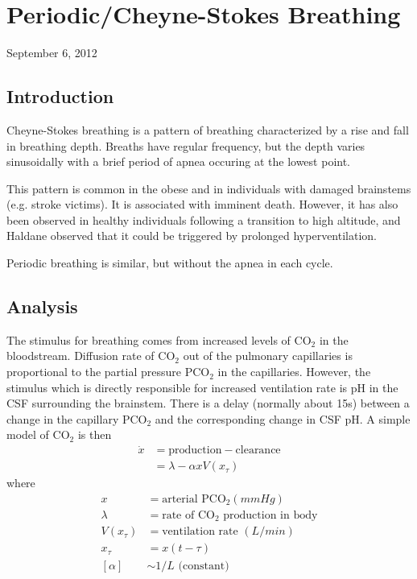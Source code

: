 \section{Periodic/Cheyne-Stokes Breathing}
September 6, 2012

\subsection{Introduction}

Cheyne-Stokes breathing is a pattern of breathing characterized by a rise and fall in breathing depth. Breaths have regular frequency, but the depth varies sinusoidally with a brief period of apnea occuring at the lowest point.

This pattern is common in the obese and in individuals with damaged brainstems (e.g. stroke victims). It is associated with imminent death. However, it has also been observed in healthy individuals following a transition to high altitude, and Haldane observed that it could be triggered by prolonged hyperventilation.

Periodic breathing is similar, but without the apnea in each cycle.

\subsection{Analysis}

The stimulus for breathing comes from increased levels of $\mathrm{CO}_2$ in the bloodstream. Diffusion rate of $\mathrm{CO}_2$ out of the pulmonary capillaries is proportional to the partial pressure $\mathrm{PCO}_2$ in the capillaries. However, the stimulus which is directly responsible for increased ventilation rate is pH in the CSF surrounding the brainstem. There is a delay (normally about 15s) between a change in the capillary $\mathrm{PCO}_2$ and the corresponding change in CSF pH. A simple model of $\mathrm{CO}_2$ is then 
\begin{align}
  \dot{x} &=\text{production}-\text{clearance}\nonumber \\ &= \lambda - \alpha xV(x_\tau)
  \label{eq:xdot}
\end{align}
where
\begin{align*}
  x &= \text{arterial PCO}_2 (mmHg)\\
  \lambda &= \text{rate of CO}_2\text{ production in body}\\
  V(x_\tau) &= \text{ventilation rate }(L/min)\\
  x_\tau &= x(t-\tau)\\
  [\alpha] &\sim 1/L \text{ (constant)}
\end{align*}

